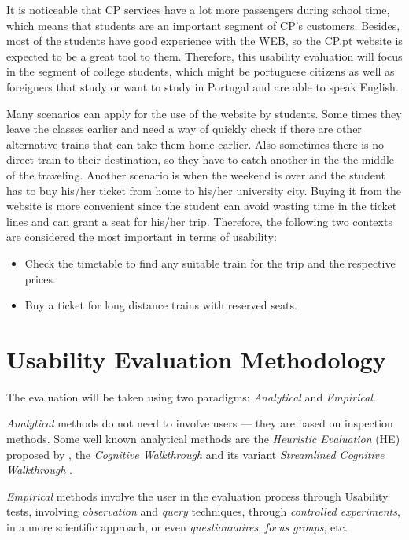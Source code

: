 \documentclass[a4paper]{article}
\begin{document}
It is noticeable that CP services have a lot more passengers during school time, which means that students are an important segment of CP's customers. Besides, most of the students have good experience with the WEB, so the CP.pt website is expected to be a great tool to them. Therefore, this usability evaluation will focus in the segment of college students, which might be portuguese citizens as well as foreigners that study or want to study in Portugal and are able to speak English.

Many scenarios can apply for the use of the website by students. Some times they leave the classes earlier and need a way of quickly check if there are other alternative trains that can take them home earlier. Also sometimes there is no direct train to their destination, so they have to catch another in the the middle of the traveling. Another scenario is when the weekend is over and the student has to buy his/her ticket from home to his/her university city. Buying it from the website is more convenient since the student can avoid wasting time in the ticket lines and can grant a seat for his/her trip. Therefore, the following two contexts are considered the most important in terms of usability:

\begin{itemize}
  \item Check the timetable to find any suitable train for the trip and the respective prices.
  \item Buy a ticket for long distance trains with reserved seats.
\end{itemize}

\section{Usability Evaluation Methodology}

The evaluation will be taken using two paradigms: \emph{Analytical} and \emph{Empirical}.

\emph{Analytical} methods do not need to involve users --- they are based on inspection methods. Some well known analytical methods are the \emph{Heuristic Evaluation} (HE) proposed by \citet{nielsen1990heuristic}, the \emph{Cognitive Walkthrough} \citep{wharton1994cognitive} and its variant \emph{Streamlined Cognitive Walkthrough} \citep{spencer2000streamlined}.

\emph{Empirical} methods involve the user in the evaluation process through Usability tests, involving \emph{observation} and \emph{query} techniques, through \emph{controlled experiments}, in a more scientific approach, or even \emph{questionnaires}, \emph{focus groups}, etc. 
\end{document}
